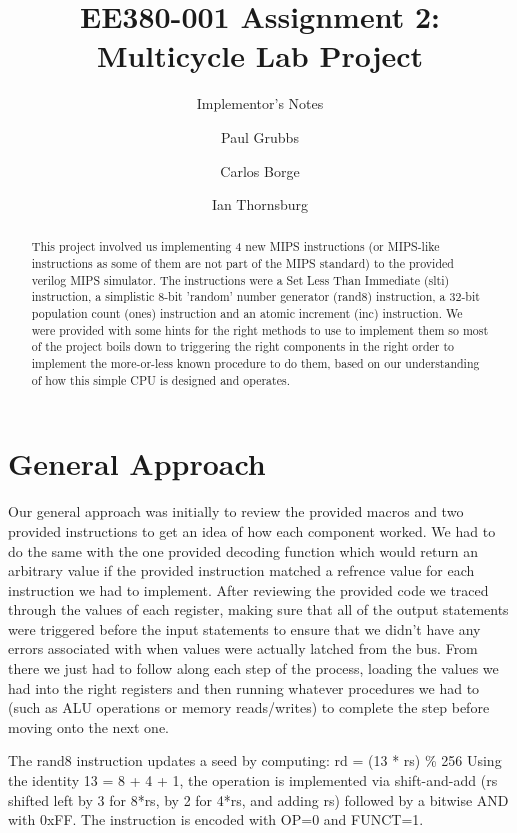 \documentclass[acmtog]{acmart}
\begin{document}

\title{EE380-001 Assignment 2: Multicycle Lab Project}
\subtitle{Implementor's Notes}

\author{Paul Grubbs}
\author{Carlos Borge}
\author{Ian Thornsburg}

\begin{abstract}
  This project involved us implementing 4 new MIPS instructions (or MIPS-like instructions as some of them are not part of the MIPS standard)
  to the provided verilog MIPS simulator. The instructions were a Set Less Than Immediate (slti) instruction, a simplistic 8-bit 'random' number generator
  (rand8) instruction, a 32-bit population count (ones) instruction and an atomic increment (inc) instruction. We were provided with some hints for 
  the right methods to use to implement them so most of the project boils down to triggering the right components in the right order to 
  implement the more-or-less known procedure to do them, based on our understanding of how this simple CPU is designed and operates.
\end{abstract}

\maketitle

\section{General Approach}
Our general approach was initially to review the provided macros and two provided instructions to get an idea of how each component worked. We had to 
do the same with the one provided decoding function which would return an arbitrary value if the provided instruction matched a refrence value for 
each instruction we had to implement. After reviewing the provided code we traced through the values of each register, making sure that all of the 
output statements were triggered before the input statements to ensure that we didn't have any errors associated with when values were actually latched 
from the bus. From there we just had to follow along each step of the process, loading the values we had into the right registers and then running whatever
procedures we had to (such as ALU operations or memory reads/writes) to complete the step before moving onto the next one.

The rand8 instruction updates a seed by computing:
	rd = (13 * rs) \% 256
Using the identity 13 = 8 + 4 + 1, the operation is implemented via shift-and-add (rs shifted left by 3 for 8*rs, by 2 for 4*rs, and adding rs) followed by a bitwise AND with 0xFF. The instruction is encoded with OP=0 and FUNCT=1.
\end{document}

